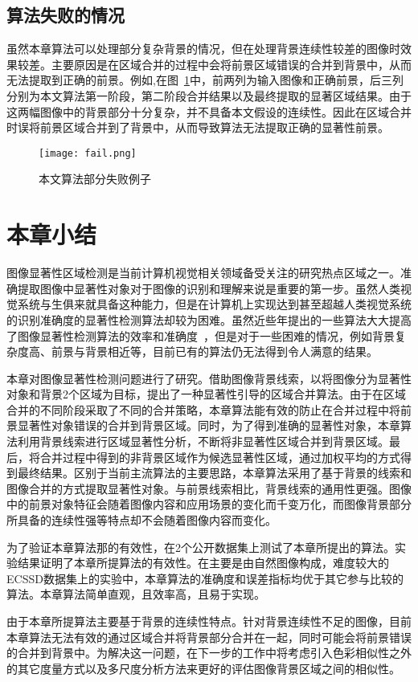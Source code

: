 \subsection{算法失败的情况}
\label{subsec:failure}

虽然本章算法可以处理部分复杂背景的情况，但在处理背景连续性较差的图像时效果较差。主要原因是在区域合并的过程中会将前景区域错误的合并到背景中，从而无法提取到正确的前景。例如,在图~\ref{fig:fail}中，前两列为输入图像和正确前景，后三列分别为本文算法第一阶段，第二阶段合并结果以及最终提取的显著区域结果。由于这两幅图像中的背景部分十分复杂，并不具备本文假设的连续性。因此在区域合并时误将前景区域合并到了背景中，从而导致算法无法提取正确的显著性前景。
 \begin{figure}[htb]
  \centering%
      {\texttt{[image: fail.png]}}

  \caption{本文算法部分失败例子}
  \label{fig:fail}
\end{figure}


\section{本章小结}
图像显著性区域检测是当前计算机视觉相关领域备受关注的研究热点区域之一。准确提取图像中显著性对象对于图像的识别和理解来说是重要的第一步。虽然人类视觉系统与生俱来就具备这种能力，但是在计算机上实现达到甚至超越人类视觉系统的识别准确度的显著性检测算法却较为困难。虽然近些年提出的一些算法大大提高了图像显著性检测算法的效率和准确度~\cite{ChengPAMI,ufo,Yan2014Hierarchical,geodesicDistance}，但是对于一些困难的情况，例如背景复杂度高、前景与背景相近等，目前已有的算法仍无法得到令人满意的结果。\par
本章对图像显著性检测问题进行了研究。借助图像背景线索，以将图像分为显著性对象和背景2个区域为目标，提出了一种显著性引导的区域合并算法。由于在区域合并的不同阶段采取了不同的合并策略，本章算法能有效的防止在合并过程中将前景显著性对象错误的合并到背景区域。同时，为了得到准确的显著性对象，本章算法利用背景线索进行区域显著性分析，不断将非显著性区域合并到背景区域。最后，将合并过程中得到的非背景区域作为候选显著性区域，通过加权平均的方式得到最终结果。区别于当前主流算法的主要思路，本章算法采用了基于背景的线索和图像合并的方式提取显著性对象。与前景线索相比，背景线索的通用性更强。图像中的前景对象特征会随着图像内容和应用场景的变化而千变万化，而图像背景部分所具备的连续性强等特点却不会随着图像内容而变化。\par
为了验证本章算法那的有效性，在2个公开数据集上测试了本章所提出的算法。实验结果证明了本章所提算法的有效性。在主要是由自然图像构成，难度较大的ECSSD数据集上的实验中，本章算法的准确度和误差指标均优于其它参与比较的算法。本章算法简单直观，且效率高，且易于实现。\par
由于本章所提算法主要基于背景的连续性特点。针对背景连续性不足的图像，目前本章算法无法有效的通过区域合并将背景部分合并在一起，同时可能会将前景错误的合并到背景中。为解决这一问题，在下一步的工作中将考虑引入色彩相似性之外的其它度量方式以及多尺度分析方法来更好的评估图像背景区域之间的相似性。
